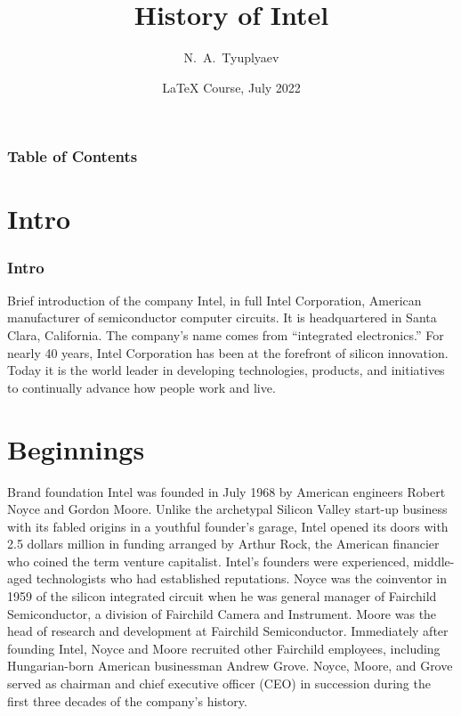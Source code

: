 \documentclass{beamer}
\title[Introduction to LaTeX] 
{History of Intel}
\author[Tyuplyaev] 
{N.~A.~Tyuplyaev\inst{1}}
\institute[HSE] 
{
  \inst{1}
  Faculty of Computer Science \\
  HSE University
}
\date[July 2022] 
{LaTeX Course, July 2022}
\begin{document}
\frame{\titlepage}

\begin{frame}
\frametitle{Table of Contents}
\tableofcontents
\end{frame}


\section{Intro}

\begin{frame}
\frametitle{Intro}
\begin{block}{Brief introduction of the company}
Intel, in full Intel Corporation, American manufacturer of semiconductor computer circuits. It is headquartered in Santa Clara, California. The company’s name comes from “integrated electronics.” For nearly 40 years, Intel Corporation has been at the forefront of silicon innovation. Today it is the world leader in developing technologies, products, and initiatives to continually advance how people work and live.
\end{block}
\end{frame}

\section{Beginnings}

\begin{frame}
\begin{block}{Brand foundation}
Intel was founded in July 1968 by American engineers Robert Noyce and Gordon Moore. Unlike the archetypal Silicon Valley start-up business with its fabled origins in a youthful founder’s garage, Intel opened its doors with 2.5 dollars million in funding arranged by Arthur Rock, the American financier who coined the term venture capitalist. Intel’s founders were experienced, middle-aged technologists who had established reputations. Noyce was the coinventor in 1959 of the silicon integrated circuit when he was general manager of Fairchild Semiconductor, a division of Fairchild Camera and Instrument. Moore was the head of research and development at Fairchild Semiconductor. Immediately after founding Intel, Noyce and Moore recruited other Fairchild employees, including Hungarian-born American businessman Andrew Grove. Noyce, Moore, and Grove served as chairman and chief executive officer (CEO) in succession during the first three decades of the company’s history.
\end{block}
\end{frame}
\end{document}
